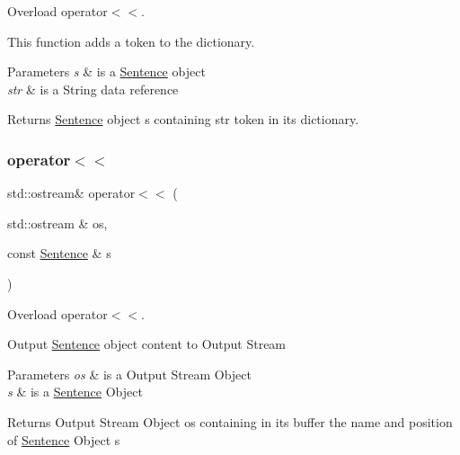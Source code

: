 Overload operator$<$$<$. 

This function adds a token to the dictionary.


\begin{DoxyParams}{Parameters}
{\em s} & is a \hyperlink{class_sentence}{Sentence} object \\
\hline
{\em str} & is a String data reference \\
\hline
\end{DoxyParams}
\begin{DoxyReturn}{Returns}
\hyperlink{class_sentence}{Sentence} object s containing str token in its dictionary. 
\end{DoxyReturn}
\mbox{\label{class_sentence_a0dd25702b7879e72e37114a601824505}} 
\subsubsection{\texorpdfstring{operator$<$$<$}{operator<<}\hspace{0.1cm}{\footnotesize\ttfamily [2/2]}}
{\footnotesize\ttfamily std\+::ostream\& operator$<$$<$ (\begin{DoxyParamCaption}\item[{std\+::ostream \&}]{os,  }\item[{const \hyperlink{class_sentence}{Sentence} \&}]{s }\end{DoxyParamCaption})\hspace{0.3cm}{\ttfamily [friend]}}



Overload operator$<$$<$. 

Output \hyperlink{class_sentence}{Sentence} object content to Output Stream


\begin{DoxyParams}{Parameters}
{\em os} & is a Output Stream Object \\
\hline
{\em s} & is a \hyperlink{class_sentence}{Sentence} Object \\
\hline
\end{DoxyParams}
\begin{DoxyReturn}{Returns}
Output Stream Object os containing in its buffer the name and position of \hyperlink{class_sentence}{Sentence} Object s 
\end{DoxyReturn}
\mbox{\label{class_sentence_afde1485f4949e9edb093c86d2ab27a2d}} 
